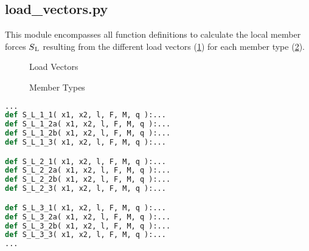 \pagebreak

\subsection{load\_vectors.py}
\label{subsec:loadvectors.py}

This module encompasses all function definitions to calculate the local member forces $S\textsubscript{L}$ \cite[4.2-4.11]{schneider} resulting from the different load vectors (\cref{fig:loadVec}) for each member type (\cref{fig:memberTypes}).


\begin{figure}[h]%
    \centering
    \qquad

    \centering
    
    \caption{Load Vectors}%
    \label{fig:loadVec}%
\end{figure}


\begin{figure}[h]%
    \centering
    \qquad

    \centering
    \qquad
    
    \caption{Member Types}%
    \label{fig:memberTypes}%
\end{figure}

\begin{inconsolata}
\begin{minipage}{\linewidth}
\begin{lstlisting}[language=python]
...
def S_L_1_1( x1, x2, l, F, M, q ):...
def S_L_1_2a( x1, x2, l, F, M, q ):...
def S_L_1_2b( x1, x2, l, F, M, q ):...
def S_L_1_3( x1, x2, l, F, M, q ):...

def S_L_2_1( x1, x2, l, F, M, q ):...
def S_L_2_2a( x1, x2, l, F, M, q ):...
def S_L_2_2b( x1, x2, l, F, M, q ):...
def S_L_2_3( x1, x2, l, F, M, q ):...

def S_L_3_1( x1, x2, l, F, M, q ):...
def S_L_3_2a( x1, x2, l, F, M, q ):...
def S_L_3_2b( x1, x2, l, F, M, q ):...
def S_L_3_3( x1, x2, l, F, M, q ):...
...
\end{lstlisting}
\end{minipage}
\end{inconsolata}

